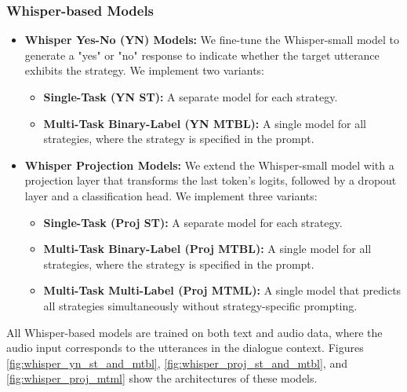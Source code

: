 \documentclass{article}
\begin{document}
\subsubsection{Whisper-based Models}
\begin{itemize}
    \item \textbf{Whisper Yes-No (YN) Models:} We fine-tune the Whisper-small model to generate a "yes" or "no" response to indicate whether the target utterance exhibits the strategy. We implement two variants:
    \begin{itemize}
        \item \textbf{Single-Task (YN ST):} A separate model for each strategy.
        \item \textbf{Multi-Task Binary-Label (YN MTBL):} A single model for all strategies, where the strategy is specified in the prompt.
    \end{itemize}
    
    \item \textbf{Whisper Projection Models:} We extend the Whisper-small model with a projection layer that transforms the last token's logits, followed by a dropout layer and a classification head. We implement three variants:
    \begin{itemize}
        \item \textbf{Single-Task (Proj ST):} A separate model for each strategy.
        \item \textbf{Multi-Task Binary-Label (Proj MTBL):} A single model for all strategies, where the strategy is specified in the prompt.
        \item \textbf{Multi-Task Multi-Label (Proj MTML):} A single model that predicts all strategies simultaneously without strategy-specific prompting.
    \end{itemize}
\end{itemize}

All Whisper-based models are trained on both text and audio data, where the audio input corresponds to the utterances in the dialogue context. Figures \ref{fig:whisper_yn_st_and_mtbl}, \ref{fig:whisper_proj_st_and_mtbl}, and \ref{fig:whisper_proj_mtml} show the architectures of these models.
\end{document}
